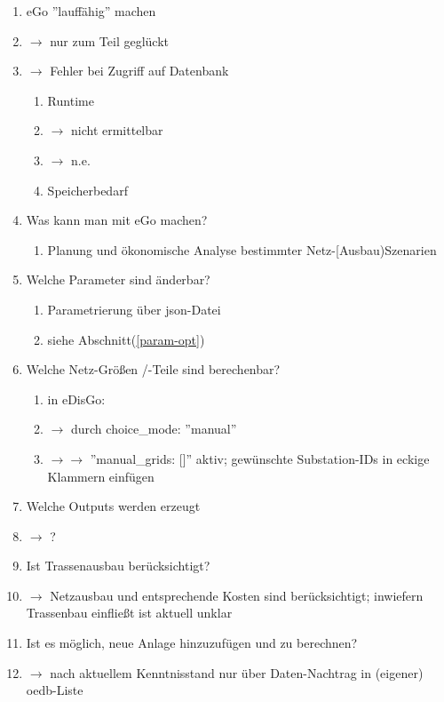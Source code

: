 \documentclass[
a4paper,     %
12pt         %
]{scrartcl}  %
\begin{document}
\begin{enumerate}
	\item eGo ''lauffähig'' machen
	\item[]$\rightarrow$ nur zum Teil geglückt
	\item[]$\rightarrow$ Fehler bei Zugriff auf Datenbank
	\begin{enumerate}
		\item Runtime
		\item[] $\rightarrow$ nicht ermittelbar
		\item[] $\rightarrow$ n.e.
		\item Speicherbedarf
	\end{enumerate}
	\item Was kann man mit eGo machen?
	\begin{enumerate}
		\item Planung und ökonomische Analyse bestimmter Netz-[Ausbau)Szenarien

	\end{enumerate}
	\item Welche Parameter sind änderbar?
	\begin{enumerate}
		\item Parametrierung über json-Datei
		\item siehe Abschnitt(\ref{param-opt})
	\end{enumerate}
	\item Welche Netz-Größen /-Teile sind berechenbar?
	\begin{enumerate}
		\item in eDisGo:
		\item[] $\rightarrow$ durch choice\_mode: ''manual''
		\item[] $\rightarrow \rightarrow$ ''manual\_grids: []'' aktiv; gewünschte Substation-IDs in eckige Klammern einfügen
	\end{enumerate}
	\item Welche Outputs werden erzeugt
	\item[] $\rightarrow$ ?

	\item Ist Trassenausbau berücksichtigt?
	\item[] $\rightarrow$ Netzausbau und entsprechende Kosten sind berücksichtigt; inwiefern Trassenbau einfließt ist aktuell unklar

	\item Ist es möglich, neue Anlage hinzuzufügen und zu berechnen?
	\item[] $\rightarrow$ nach aktuellem Kenntnisstand nur über Daten-Nachtrag in (eigener) oedb-Liste


\end{enumerate}
\end{document}

